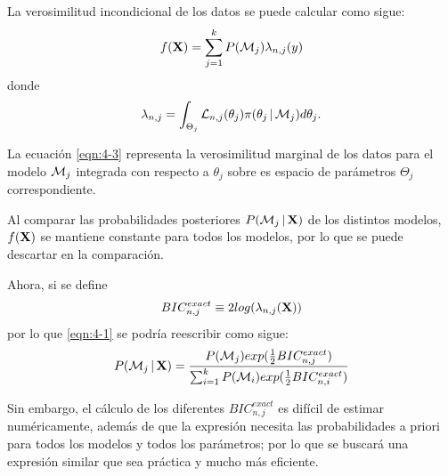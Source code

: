 La verosimilitud incondicional de los datos se puede calcular como sigue: 
\begin{equation}
f(\textbf{X}) = \sum_{j=1}^k P(\mathcal{M}_j) \lambda_{n, j}(y)
\label{eqn:4-2}
\end{equation}
donde 
\begin{equation}
\lambda_{n, j} = \int_{\Theta_j} \mathcal{L}_{n, j}(\theta_j) \pi(\theta_j \,|\, \mathcal{M}_j) d\theta_j.
\label{eqn:4-3}
\end{equation}

La ecuación \eqref{eqn:4-3} representa la verosimilitud marginal de los datos para el modelo $\mathcal{M}_j$ integrada con respecto a $\theta_j$ sobre es espacio de parámetros $\Theta_j$ correspondiente.

Al comparar las probabilidades posteriores $P(\mathcal{M}_j \,|\, \textbf{X})$ de los distintos modelos, $f(\textbf{X})$ se mantiene constante para todos los modelos, por lo que se puede descartar en la comparación.

Ahora, si se define 
\begin{equation}
BIC_{n, j}^{exact} \equiv 2 log(\lambda_{n, j}(\textbf{X}))
\label{eqn:4-4}
\end{equation}
por lo que \eqref{eqn:4-1} se podría reescribir como sigue: 
\begin{equation}
P(\mathcal{M}_j \,|\, \textbf{X}) = \frac{ P(\mathcal{M}_j)  exp(\frac{1}{2} BIC_{n, j}^{exact}) }
{ \sum_{i=1}^k  P(\mathcal{M}_i) exp(\frac{1}{2} BIC_{n, i}^{exact}) }
\label{eqn:4-5}
\end{equation}

Sin embargo, el cálculo de los diferentes $BIC_{n, j}^{exact}$ es difícil de estimar numéricamente, además de que la expresión necesita las probabilidades a priori para todos los modelos y todos los parámetros; por lo que se buscará una expresión similar que sea práctica y mucho más eficiente.

